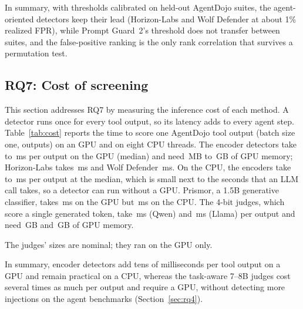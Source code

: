 In summary, with thresholds calibrated on held-out AgentDojo suites, the agent-oriented detectors keep their lead (Horizon-Labs \LoHZTpr and Wolf Defender \LoWFTpr at about 1\% realized FPR), while Prompt Guard~2's threshold does not transfer between suites, and the false-positive ranking is the only rank correlation that survives a permutation test.

\subsection{RQ7: Cost of screening}
\label{sec:cost}

This section addresses RQ7 by measuring the inference cost of each method. A detector runs once for every tool output, so its latency adds to every agent step. Table~\ref{tab:cost} reports the time to score one AgentDojo tool output (batch size one, \NCostOutputs outputs) on an \CostGPU GPU and on eight CPU threads. The encoder detectors take \CostEncMinMs to \CostEncMaxMs\,ms per output on the GPU (median) and need \CostEncMinMem\,MB to \CostEncMaxMem\,GB of GPU memory; Horizon-Labs takes \CostHZGpu\,ms and Wolf Defender \CostWFGpu\,ms. On the CPU, the encoders take \CostPGtsCpu to \CostEncMaxCpu\,ms per output at the median, which is small next to the seconds that an LLM call takes, so a detector can run without a GPU. Prismor, a 1.5B generative classifier, takes \CostPRGpu\,ms on the GPU but \CostPRCpu\,ms on the CPU. The 4-bit judges, which score a single generated token, take \CostJQGpu\,ms (Qwen) and \CostJLGpu\,ms (Llama) per output and need \CostJQMem\,GB and \CostJLMem\,GB of GPU memory.

\begin{table}[t]
\centering\small
\caption{Inference cost per tool output (batch size one), sorted by size. Memory is peak GPU memory including weights.}
\label{tab:cost}

\par\smallskip\footnotesize\raggedright
The judges' sizes are nominal; they ran on the GPU only.
\end{table}

In summary, encoder detectors add tens of milliseconds per tool output on a GPU and remain practical on a CPU, whereas the task-aware 7--8B judges cost several times as much per output and require a GPU, without detecting more injections on the agent benchmarks (Section~\ref{sec:rq4}).
